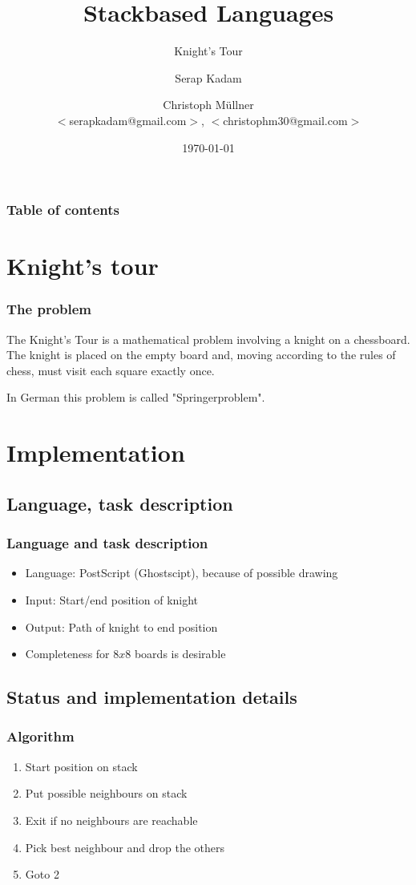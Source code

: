 \documentclass{beamer}
\begin{document}
\title{Stackbased Languages}
\author[Serap Kadam \and Christoph M{\"u}llner]{Serap Kadam \and Christoph M{\"u}llner \\
$<$serapkadam@gmail.com$>$, $<$christophm30@gmail.com$>$}
\subtitle{Knight's Tour}

\date{\today} 

\begin{frame}
\titlepage
\end{frame}

\begin{frame}
\frametitle{Table of contents}
\tableofcontents
\end{frame} 

\section{Knight's tour} 
\begin{frame}
\frametitle{The problem}
The Knight's Tour is a mathematical problem involving a knight
on a chessboard. The knight is placed on the empty board and,
moving according to the rules of chess, must visit each square
exactly once.

In German this problem is called "Springerproblem".
\end{frame}

\section{Implementation}
\subsection{Language, task description}
\begin{frame}
\frametitle{Language and task description}
\begin{itemize}
	\item Language: PostScript (Ghostscipt), because of possible drawing
	\item Input: Start/end position of knight
	\item Output: Path of knight to end position
	\item Completeness for $8 x 8$ boards is desirable
\end{itemize}
\end{frame}

\subsection{Status and implementation details}
\begin{frame}
\frametitle{Algorithm}
\begin{enumerate}
	\item Start position on stack
	\item Put possible neighbours on stack
	\item Exit if no neighbours are reachable
	\item Pick best neighbour and drop the others
	\item Goto 2
\end{enumerate}
\end{frame}
\end{document}

